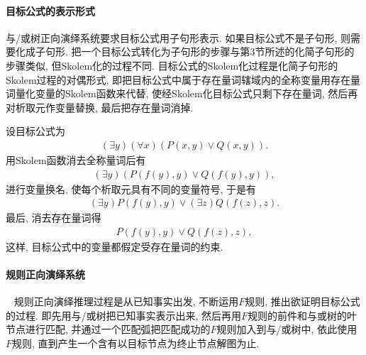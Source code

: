 \paragraph{目标公式的表示形式}
    与/或树正向演绎系统要求目标公式用子句形表示. 如果目标公式不是子句形, 则需要化成子句形. 把一个目标公式转化为子句形的步骤与第3节所述的化简子句形的步骤类似, 但Skolem化的过程不同. 目标公式的Skolem化过程是化简子句形的Skolem过程的对偶形式, 即把目标公式中属于存在量词辖域内的全称变量用存在量词量化变量的Skolem函数来代替, 使经Skolem化目标公式只剩下存在量词, 然后再对析取元作变量替换, 最后把存在量词消掉.
\begin{example}
设目标公式为
\begin{align}
    (\exists  y) (\forall x) (P(x, y)\vee Q(x, y)).
\end{align}
用Skolem函数消去全称量词后有
\begin{align}
    (\exists  y)(P(f(y), y)\vee Q(f(y), y)),
\end{align}
进行变量换名, 使每个析取元具有不同的变量符号, 于是有
\begin{align}
    (\exists  y)P(f(y), y)\vee (\exists  z)Q(f(z), z).
\end{align}
最后, 消去存在量词得
\begin{align}
    P(f(y), y)\vee Q(f(z), z),
\end{align}
这样, 目标公式中的变量都假定受存在量词的约束.
\end{example}
\paragraph{规则正向演绎系统}~{}
规则正向演绎推理过程是从已知事实出发, 不断运用$F$规则, 推出欲证明目标公式的过程. 即先用与/或树把已知事实表示出来, 然后再用$F$规则的前件和与或树的叶节点进行匹配, 并通过一个匹配弧把匹配成功的$F$规则加入到与/或树中, 依此使用$F$规则, 直到产生一个含有以目标节点为终止节点解图为止.

